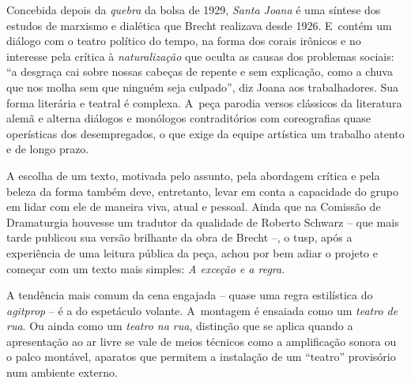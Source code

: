 Concebida depois da {\it quebra} da bolsa de 1929, {\it Santa Joana} é
uma síntese dos estudos de marxismo e dialética que Brecht realizava
desde 1926. E~contém um diálogo com o teatro político do tempo, na forma
dos corais irônicos e no interesse pela crítica à {\it naturalização}
que oculta as causas dos problemas sociais: “a desgraça cai sobre nossas
cabeças de repente e sem explicação, como a chuva que nos molha sem que
ninguém seja culpado”, diz Joana aos trabalhadores. Sua forma literária
e teatral é complexa. A~peça parodia versos clássicos da literatura
alemã e alterna diálogos e monólogos contraditórios com coreografias
quase operísticas dos desempregados, o que exige da equipe artística um
trabalho atento e de longo prazo.

A escolha de um texto, motivada pelo assunto, pela abordagem crítica e
pela beleza da forma também deve, entretanto, levar em conta a
capacidade do grupo em lidar com ele de maneira viva, atual e pessoal.
Ainda que na Comissão de Dramaturgia houvesse um tradutor da qualidade
de Roberto Schwarz -- que mais tarde publicou sua versão brilhante da
obra de Brecht --, o {\sc tusp}, após a experiência de uma leitura pública da
peça, achou por bem adiar o projeto e começar com um texto mais simples:
{\it A exceção e a regra}.


\subject{Modelos de teatralidade: a cena volante}


A tendência mais comum da cena engajada -- quase uma regra estilística do
{\it agitprop} -- é a do espetáculo volante. A~montagem é ensaiada como
um {\it teatro de rua}. Ou ainda como um {\it teatro na rua}, distinção
que se aplica quando a apresentação ao ar livre se vale de meios
técnicos como a amplificação sonora ou o palco montável, aparatos que
permitem a instalação de um “teatro” provisório num ambiente externo.

